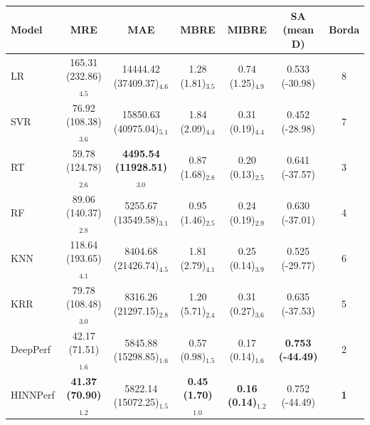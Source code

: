 \begin{tabular}{lcccccc}
\toprule
Model & MRE & MAE & MBRE & MIBRE & SA (mean D) & Borda \\
\midrule
LR & 165.31 (232.86)$_{4.5}$ & 14444.42 (37409.37)$_{4.6}$ & 1.28 (1.81)$_{3.5}$ & 0.74 (1.25)$_{4.9}$ & 0.533 (-30.98) & 8 \\
SVR & 76.92 (108.38)$_{3.6}$ & 15850.63 (40975.04)$_{5.1}$ & 1.84 (2.09)$_{4.4}$ & 0.31 (0.19)$_{4.4}$ & 0.452 (-28.98) & 7 \\
RT & 59.78 (124.78)$_{2.6}$ & \textbf{4495.54 (11928.51)$_{3.0}$} & 0.87 (1.68)$_{2.8}$ & 0.20 (0.13)$_{2.5}$ & 0.641 (-37.57) & 3 \\
RF & 89.06 (140.37)$_{2.8}$ & 5255.67 (13549.58)$_{3.1}$ & 0.95 (1.46)$_{2.5}$ & 0.24 (0.19)$_{2.9}$ & 0.630 (-37.01) & 4 \\
KNN & 118.64 (193.65)$_{4.1}$ & 8404.68 (21426.74)$_{4.5}$ & 1.81 (2.79)$_{4.1}$ & 0.25 (0.14)$_{3.9}$ & 0.525 (-29.77) & 6 \\
KRR & 79.78 (108.48)$_{3.0}$ & 8316.26 (21297.15)$_{2.8}$ & 1.20 (5.71)$_{2.4}$ & 0.31 (0.27)$_{3.6}$ & 0.635 (-37.53) & 5 \\
DeepPerf & 42.17 (71.51)$_{1.6}$ & 5845.88 (15298.85)$_{1.6}$ & 0.57 (0.98)$_{1.5}$ & 0.17 (0.14)$_{1.6}$ & \textbf{0.753 (-44.49)} & 2 \\
HINNPerf & \textbf{41.37 (70.90)$_{1.2}$} & 5822.14 (15072.25)$_{1.5}$ & \textbf{0.45 (1.70)$_{1.0}$} & \textbf{0.16 (0.14)$_{1.2}$} & 0.752 (-44.49) & \textbf{1} \\
\bottomrule
\end{tabular}
